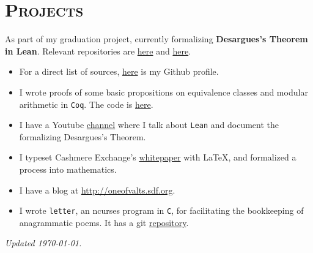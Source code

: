 \documentclass[oneside, 12pt]{memoir}
\begin{document}
\section*{\textsc{Projects}}
\begin{tcolorbox}[left=2pt,right=2pt,top=2pt,bottom=2pt]
    As part of my graduation project, currently formalizing
    \textbf{Desargues's Theorem in Lean}. Relevant repositories are
    \href{https://github.com/oneofvalts/desargues-doc}{here} and
    \href{https://github.com/oneofvalts/desargues}{here}.
\end{tcolorbox}
\begin{itemize}[leftmargin=*]
    \item For a direct list of sources,
        \href{https://github.com/oneofvalts}{here} is my Github profile.
    \item I wrote proofs of some basic propositions on equivalence classes
        and modular arithmetic in \texttt{Coq}. The code is
        \href{https://github.com/oneofvalts/equivalence-classes}{here}.
    \item I have a Youtube
        \href{https://www.youtube.com/@veryarticulateloudthinker}{channel}
        where I talk about \texttt{Lean} and document the formalizing
        Desargues's Theorem.
    \item I typeset Cashmere Exchange's
        \href{https://docsend.com/view/ryp2wmfc5yxaabep}{whitepaper} with
        \LaTeX, and formalized a process into mathematics.
    \item I have a blog at \url{http://oneofvalts.sdf.org}.
    \item I wrote \texttt{letter}, an ncurses program in \texttt{C}, for
        facilitating the bookkeeping of anagrammatic poems. It has a git
        \href{https://github.com/oneofvalts/letter}{repository}.
\end{itemize}
\vfill\hfill{}\tiny\textit{Updated \today.}
\end{document}
